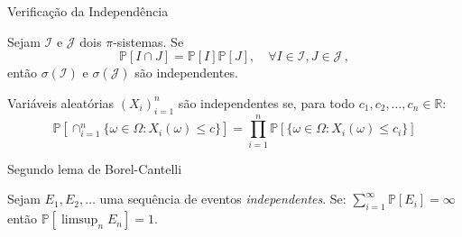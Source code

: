 \documentclass[11pt]{beamer}
\begin{document}
\begin{frame}{Verificação da Independência}
\begin{lemma}
	Sejam $\mathcal{I}$ e $\mathcal{J}$ dois $\pi$-sistemas. Se
	$$\mathbb{P}[I \cap J] = \mathbb{P}[I]\mathbb{P}[J],\quad \forall I \in \mathcal{I}, J \in \mathcal{J}\, ,$$
	então $\sigma(\mathcal{I})$ e $\sigma(\mathcal{J})$ são independentes.
\end{lemma}
\begin{corollary}
	Variáveis aleatórias $(X_i)_{i=1}^n$ são independentes se, para todo $c_1, c_2,\ldots, c_n \in \mathbb{R}$:
	$$\mathbb{P}[\cap_{i=1}^n \{\omega \in \Omega: X_i(\omega) \leq c\}] = \prod_{i=1}^n \mathbb{P}[\{\omega \in \Omega: X_i(\omega) \leq c_i\}]$$
\end{corollary}
\end{frame}


\begin{frame}{Segundo lema de Borel-Cantelli}
\begin{lemma}
	Sejam $E_1,E_2,\ldots$ uma sequência de eventos \textit{independentes}. Se:
	$\sum_{i=1}^\infty \mathbb{P}[E_i]=\infty$
	então $\mathbb{P}[\limsup_{n}E_n]=1$.
\end{lemma}
\end{frame}
\end{document}

